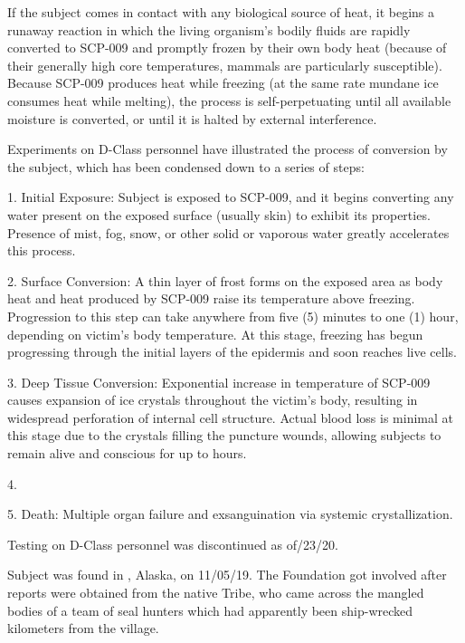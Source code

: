 If the subject comes in contact with any biological source of heat, it begins a runaway reaction in which the living organism's bodily fluids are rapidly converted to SCP-009 and promptly frozen by their own body heat (because of their generally high core temperatures, mammals are particularly susceptible). Because SCP-009 produces heat while freezing (at the same rate mundane ice consumes heat while melting), the process is self-perpetuating until all available moisture is converted, or until it is halted by external interference.

Experiments on D-Class personnel have illustrated the process of conversion by the subject, which has been condensed down to a series of steps:

1. Initial Exposure: Subject is exposed to SCP-009, and it begins converting any water present on the exposed surface (usually skin) to exhibit its properties. Presence of mist, fog, snow, or other solid or vaporous water greatly accelerates this process.

2. Surface Conversion: A thin layer of frost forms on the exposed area as body heat and heat produced by SCP-009 raise its temperature above freezing. Progression to this step can take anywhere from five (5) minutes to one (1) hour, depending on victim's body temperature. At this stage, freezing has begun progressing through the initial layers of the epidermis and soon reaches live cells.

3. Deep Tissue Conversion: Exponential increase in temperature of SCP-009 causes expansion of ice crystals throughout the victim's body, resulting in widespread perforation of internal cell structure. Actual blood loss is minimal at this stage due to the crystals filling the puncture wounds, allowing subjects to remain alive and conscious for up to  hours.

4. \expunged

5. Death: Multiple organ failure and exsanguination via systemic crystallization.

Testing on D-Class personnel was discontinued as of/23/20.

 Subject was found in , Alaska, on 11/05/19. The Foundation got involved after reports were obtained from the native  Tribe, who came across the mangled bodies of a team of seal hunters which had apparently been ship-wrecked  kilometers from the village.


